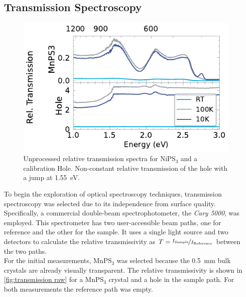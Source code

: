 \documentclass[
	twoside,
	parskip=half,
	a4paper,
]{scrbook}
\begin{document}
\subsection{Transmission Spectroscopy}
\begin{figure}
	\centering
	\includegraphics{../figures/2024-03-15 MnPS3 transmission raw.pdf}
	\caption{Unprocessed relative transmission spectra for NiPS$_3$ and a calibration Hole. Non-constant relative transmission of the hole with a jump at \SI{1.55}{eV}.}
	\label{fig:transmission raw}
\end{figure}
To begin the exploration of optical spectroscopy techniques, transmission spectroscopy was selected due to its independence from surface quality.
Specifically, a commercial double-beam spectrophotometer, the \textit{Cary 5000}, was employed.
This spectrometer has two user-accessible beam paths, one for reference and the other for the sample.
It uses a single light source and two detectors to calculate the relative transmissivity as $T = \nicefrac{I_\text{Sample}}{I_\text{Reference}}$ between the two paths.\\
For the initial measurements, MnPS$_3$ was selected because the \SI{.5}{mm} bulk crystals are already visually transparent.
The relative transmissivity is shown in \autoref{fig:transmission raw} for a MnPS$_3$ crystal and a hole in the sample path. For both measurements the reference path was empty.\\
\end{document}
